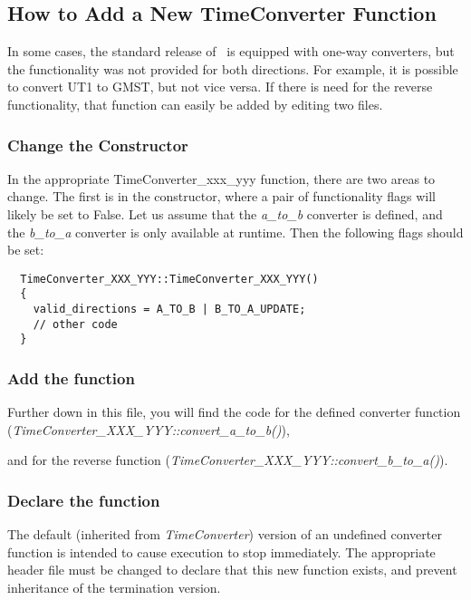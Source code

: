 \subsection{How to Add a New TimeConverter Function}\label{ref:howtoaddanewconverterfunction}
In some cases, the standard release of \JEODid\ is equipped with one-way
converters, but the functionality was not provided for both directions.
 For example, it is possible to convert UT1 to GMST, but not vice
versa.  If there is need for the reverse functionality, that function
can easily be added by editing two files.




\subsubsection{Change the Constructor}
In the appropriate TimeConverter\_xxx\_yyy function, there are two areas
to change.  The first is in the constructor, where a pair of
functionality flags will likely be set to False.  Let us assume that
the \textit{a\_to\_b} converter is defined, and the \textit{b\_to\_a}
converter is only available at runtime.  Then the following flags should be set:

\begin{verbatim}
  TimeConverter_XXX_YYY::TimeConverter_XXX_YYY()
  {
    valid_directions = A_TO_B | B_TO_A_UPDATE;
    // other code
  }
\end{verbatim}

\subsubsection{Add the function}
Further down in this file, you will find the code for the defined
converter function
(\textit{TimeConverter\_XXX\_YYY::convert\_a\_to\_b()}),

and for the reverse function
(\textit{TimeConverter\_XXX\_YYY::convert\_b\_to\_a()}).




\subsubsection{Declare the function}
The default (inherited from \textit{TimeConverter}) version of an
undefined converter function is intended to cause execution to stop
immediately.  The appropriate header file must be changed to declare
that this new function exists, and prevent inheritance of the
termination version.

